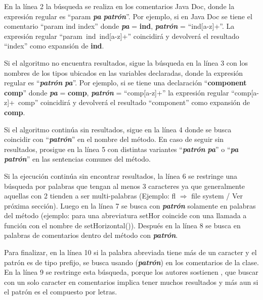 En la línea 2 la búsqueda se realiza en los comentarios Java Doc, donde la expresión regular es “\at param \textit{\textbf{pa}} \textit{\textbf{patrón}}”. Por ejemplo, si en Java Doc se tiene el comentario “\at param ind index” donde \textit{\textbf{pa}} = \textbf{ind}, \textit{\textbf{patrón}} = \mbox{“ind[a-z]+”}. La expresión regular \mbox{“\at param ind ind[a-z]+”} coincidirá y devolverá el resultado  “index” como expansión de \textbf{ind}.

Si el algoritmo no encuentra resultados, sigue la búsqueda en la línea 3 con los nombres de los tipos ubicados en las variables declaradas, donde la expresión regular es “\textit{\textbf{patrón}} \textit{\textbf{pa}}”. Por ejemplo, si se tiene una declaración “\textbf{component comp}” donde \textit{\textbf{pa}} = \textbf{comp}, \textit{\textbf{patrón}} = “comp[a-z]+”  la expresión regular \mbox{“comp[a-z]+ comp”} coincidirá y devolverá el resultado  “component” como expansión de \textbf{comp}.

Si el algoritmo continúa sin resultados, sigue en la línea 4 donde se busca coincidir con “\textit{\textbf{patrón}}” en el nombre del método. En caso de seguir sin resultados, prosigue en la línea 5 con distintas variantes “\textit{\textbf{patrón}} \textit{\textbf{pa}}” o “\textit{\textbf{pa}} \textit{\textbf{patrón}}” en las sentencias comunes del método. 


Si la ejecución continúa sin encontrar resultados, la línea 6 se restringe una búsqueda por palabras que tengan al menos 3 caracteres ya que generalmente aquellas con 2 tienden a ser multi-palabras (Ejemplo: \textsf{fl $\Rightarrow$ file system} / Ver próxima sección). Luego en la línea 7 se busca con \textit{\textbf{patrón}} solamente en palabras del método (ejemplo: para una abreviatura \textsf{setHor} coincide con una llamada a función con el nombre de \textsf{setHorizontal()}). Después en la línea 8 se busca en palabras de comentarios dentro del método con \textit{\textbf{patrón}}.

Para finalizar, en la línea 10 si la palabra abreviada tiene más de un caracter y el patrón es de tipo prefijo, se busca usando (\textit{\textbf{patrón}}) en los comentarios de la clase. En la línea 9 se restringe esta búsqueda, porque los autores sostienen \cite{EZH08}, que buscar con un solo caracter en comentarios implica tener muchos resultados y más aun si el patrón es el compuesto por letras.

